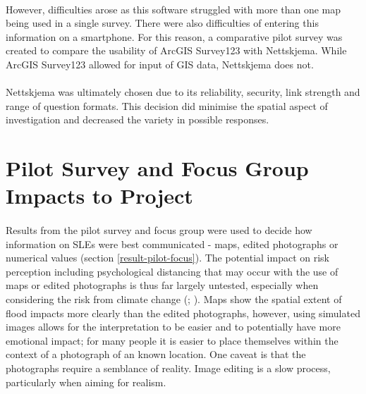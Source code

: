 \paragraph{}

However, difficulties arose as this software struggled with more than one map being used in a single survey. There were also difficulties of entering this information on a smartphone. For this reason, a comparative pilot survey was created to compare the usability of ArcGIS Survey123 with Nettskjema. While ArcGIS Survey123 allowed for input of GIS data, Nettskjema does not.
\paragraph{}
Nettskjema was ultimately chosen due to its reliability, security, link strength and range of question formats.  This decision did minimise the spatial aspect of investigation and decreased the variety in possible responses.

\section{Pilot Survey and Focus Group Impacts to Project}
 
\paragraph{}
Results from the pilot survey and focus group were used to decide how information on SLEs were best communicated - maps, edited photographs or numerical values (section \ref{result-pilot-focus}). The potential impact on risk perception  including psychological distancing that may occur with the use of maps or edited photographs is thus far largely untested, especially when considering the risk from climate change (\cite{retchless_understanding_2018};  \cite{spence_psychological_2012}). Maps show the spatial extent of flood impacts more clearly than the edited photographs, however, using simulated images allows for the interpretation to be easier and to potentially have more emotional impact; for many people it is easier to place themselves within the context of a photograph of an known location. One caveat is that the photographs require a semblance of reality. Image editing is a slow process, particularly when aiming for realism.
\paragraph{}

